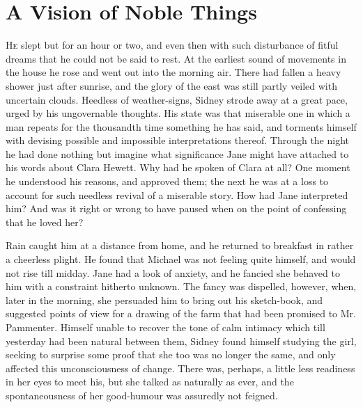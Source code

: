 \chapter{A Vision of Noble Things}

\textsc{He} slept but for an hour or two, and even then with such
disturbance of fitful dreams that he could not be said to rest. At the
earliest sound of movements in the house he rose and went out into the
morning air. There had fallen a heavy shower just after sunrise, and the
glory of the east was still partly veiled with uncertain clouds.
Heedless of weather-signs, Sidney strode away at a great pace, urged by
his ungovernable thoughts. His state was that miserable one in which a
man repeats for the thousandth time something he has said, and torments
himself with devising possible and impossible interpretations thereof.
Through the night he had done nothing but imagine what significance Jane
might have attached to his words {\protect\hypertarget{122}{}{}}about
Clara Hewett. Why had he spoken of Clara at all? One moment he
understood his reasons, and approved them; the next he was at a loss to
account for such needless revival of a miserable story. How had Jane
interpreted him? And was it right or wrong to have paused when on the
point of confessing that he loved her?

Rain caught him at a distance from home, and he returned to breakfast in
rather a cheerless plight. He found that Michael was not feeling quite
himself, and would not rise till midday. Jane had a look of anxiety, and
he fancied she behaved to him with a constraint hitherto unknown. The
fancy was dispelled, however, when, later in the morning, she persuaded
him to bring out his sketch-book, and suggested points of view for a
drawing of the farm that had been promised to Mr. Pammenter. Himself
unable to recover the tone of calm intimacy which till yesterday had
been natural between them, Sidney found himself studying the girl,
seeking to surprise some proof that she too was no longer the
{\protect\hypertarget{123}{}{}}same, and only affected this
unconsciousness of change. There was, perhaps, a little less readiness
in her eyes to meet his, but she talked as naturally as ever, and the
spontaneousness of her good-humour was assuredly not feigned.


